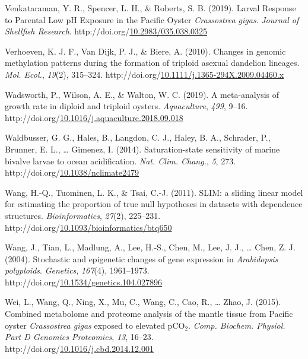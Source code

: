 \documentclass [11pt, proquest] {uwthesis}[2015/03/03]
\newlength{\cslhangindent}
\newenvironment{CSLReferences}%
{\setlength{\parindent}{0pt}%
\everypar{\setlength{\hangindent}{\cslhangindent}}\ignorespaces}%
{\par}
\begin{document}
\begin{CSLReferences}{1}{0}
\leavevmode\hypertarget{ref-Venkataraman2019}{}%
Venkataraman, Y. R., Spencer, L. H., \& Roberts, S. B. (2019). {Larval Response to Parental Low pH Exposure in the Pacific Oyster \emph{Crassostrea gigas}}. \emph{Journal of Shellfish Research}. http://doi.org/\href{https://doi.org/10.2983/035.038.0325}{10.2983/035.038.0325}

\leavevmode\hypertarget{ref-Verhoeven2010}{}%
Verhoeven, K. J. F., Van Dijk, P. J., \& Biere, A. (2010). {Changes in genomic methylation patterns during the formation of triploid asexual dandelion lineages}. \emph{Mol. Ecol.}, \emph{19}(2), 315--324. http://doi.org/\href{https://doi.org/10.1111/j.1365-294X.2009.04460.x}{10.1111/j.1365-294X.2009.04460.x}

\leavevmode\hypertarget{ref-Wadsworth2019}{}%
Wadsworth, P., Wilson, A. E., \& Walton, W. C. (2019). {A meta-analysis of growth rate in diploid and triploid oysters}. \emph{Aquaculture}, \emph{499}, 9--16. http://doi.org/\href{https://doi.org/10.1016/j.aquaculture.2018.09.018}{10.1016/j.aquaculture.2018.09.018}

\leavevmode\hypertarget{ref-Waldbusser2014}{}%
Waldbusser, G. G., Hales, B., Langdon, C. J., Haley, B. A., Schrader, P., Brunner, E. L., \ldots{} Gimenez, I. (2014). {Saturation-state sensitivity of marine bivalve larvae to ocean acidification}. \emph{Nat. Clim. Chang.}, \emph{5}, 273. http://doi.org/\href{https://doi.org/10.1038/nclimate2479}{10.1038/nclimate2479}

\leavevmode\hypertarget{ref-Wang2011}{}%
Wang, H.-Q., Tuominen, L. K., \& Tsai, C.-J. (2011). {SLIM: a sliding linear model for estimating the proportion of true null hypotheses in datasets with dependence structures}. \emph{Bioinformatics}, \emph{27}(2), 225--231. http://doi.org/\href{https://doi.org/10.1093/bioinformatics/btq650}{10.1093/bioinformatics/btq650}

\leavevmode\hypertarget{ref-Wang2004}{}%
Wang, J., Tian, L., Madlung, A., Lee, H.-S., Chen, M., Lee, J. J., \ldots{} Chen, Z. J. (2004). {Stochastic and epigenetic changes of gene expression in \emph{Arabidopsis polyploids}}. \emph{Genetics}, \emph{167}(4), 1961--1973. http://doi.org/\href{https://doi.org/10.1534/genetics.104.027896}{10.1534/genetics.104.027896}

\leavevmode\hypertarget{ref-Wei2015}{}%
Wei, L., Wang, Q., Ning, X., Mu, C., Wang, C., Cao, R., \ldots{} Zhao, J. (2015). {Combined metabolome and proteome analysis of the mantle tissue from Pacific oyster \emph{Crassostrea gigas} exposed to elevated {pCO\(_2\)}}. \emph{Comp. Biochem. Physiol. Part D Genomics Proteomics}, \emph{13}, 16--23. http://doi.org/\href{https://doi.org/10.1016/j.cbd.2014.12.001}{10.1016/j.cbd.2014.12.001}


\end{CSLReferences}
\end{document}
